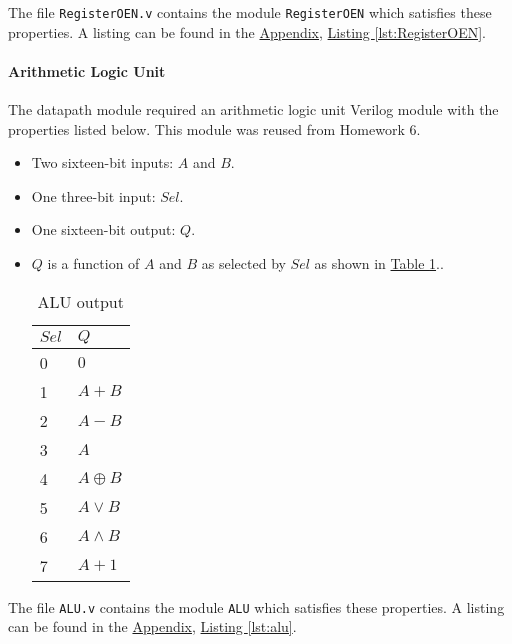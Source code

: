 The file \verb|RegisterOEN.v| contains the module \verb|RegisterOEN| which satisfies these properties.
A listing can be found in the \hyperref[sec:appendix]{Appendix}, \hyperref[lst:RegisterOEN]{Listing \ref*{lst:RegisterOEN}}.

\paragraph{Arithmetic Logic Unit} \label{par:alu}

The datapath module required an arithmetic logic unit Verilog module with the properties listed below.
This module was reused from Homework 6.

\begin{itemize}
    \item Two sixteen-bit inputs: $A$ and $B$.
    \item One three-bit input: $Sel$.
    \item One sixteen-bit output: $Q$.
    \item $Q$ is a function of $A$ and $B$ as selected by $Sel$ as shown in \hyperref[tab:alu]{Table \ref*{tab:alu}}..
        \begin{table}[htbp]
            \centering
            \begin{tabular}{ll}             \toprule
                $Sel$       & $Q$           \\\midrule
                0           & $0$           \\
                1           & $A + B$       \\
                2           & $A - B$       \\
                3           & $A$           \\
                4           & $A \oplus B$  \\
                5           & $A \lor B$    \\
                6           & $A \land B$   \\
                7           & $A + 1$       \\\bottomrule
            \end{tabular}
            \caption{ALU output}
            \label{tab:alu}
        \end{table}
\end{itemize}

The file \verb|ALU.v| contains the module \verb|ALU| which satisfies these properties.
A listing can be found in the \hyperref[sec:appendix]{Appendix}, \hyperref[lst:alu]{Listing \ref*{lst:alu}}.